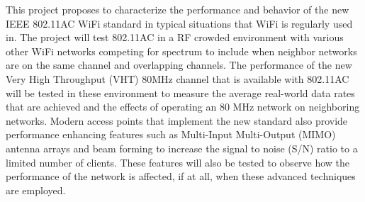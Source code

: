 This project proposes to characterize the performance and behavior of the new IEEE 802.11AC WiFi standard in typical situations that WiFi is regularly used in. The project will test 802.11AC in a RF crowded environment with various other WiFi networks competing for spectrum to include when neighbor networks are on the same channel and overlapping channels. The performance of the new Very High Throughput (VHT) 80MHz channel that is available with 802.11AC will be tested in these environment to measure the average real-world data rates that are achieved and the effects of operating an 80 MHz network on neighboring networks. Modern access points that implement the new standard also provide performance enhancing features such as Multi-Input Multi-Output (MIMO) antenna arrays and beam forming to increase the signal to noise (S/N) ratio to a limited number of clients. These features will also be tested to observe how the performance of the network is affected, if at all, when these advanced techniques are employed. 
